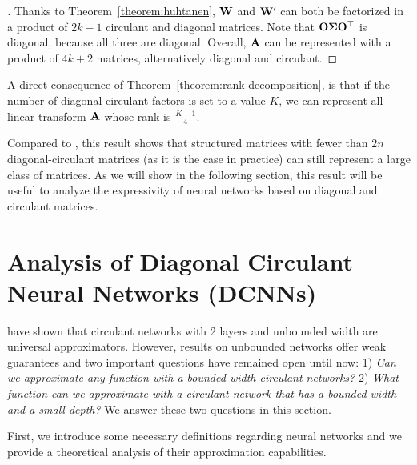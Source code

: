 \begin{proof}[]
Thanks to Theorem~\ref{theorem:huhtanen}, $\mathbf{W}$ and $\mathbf{W}'$ can both be factorized in a product of $2k-1$ circulant and diagonal matrices.
Note that $\mathbf{O} \mathbf{\Sigma} \mathbf{O}^\top$ is diagonal, because all three are diagonal.
Overall, $\mathbf{A}$ can be represented with a product of $4k+2$ matrices, alternatively diagonal and circulant.
\end{proof}


A direct consequence of Theorem~\ref{theorem:rank-decomposition}, is that if the number of diagonal-circulant factors is set to a value $K$, we can represent all linear transform $\mathbf{A}$ whose rank is $\frac{K - 1}{4}$.

Compared to \citet{Huhtanen2015}, this result shows that structured matrices with fewer than $2n$ diagonal-circulant matrices (as it is the case in practice) can still represent a large class of matrices.
As we will show in the following section, this result will be useful to analyze the expressivity of neural networks based on diagonal and circulant matrices.


 \section{Analysis of Diagonal Circulant Neural Networks (DCNNs)}
\label{section:analysis_diagonal_circulant}

\citet{pmlr-v70-zhao17b} have shown that circulant networks with 2 layers and unbounded width are universal approximators. However, results on unbounded networks offer weak guarantees and two important questions have remained open until now: 1) \emph{Can we approximate any function with a bounded-width circulant networks?} 2) \emph{What function can we approximate with a circulant network that has a bounded width and a small depth?} 
We answer these two questions in this section.

First, we introduce some necessary definitions regarding neural networks and we provide a theoretical analysis of their approximation capabilities.  

